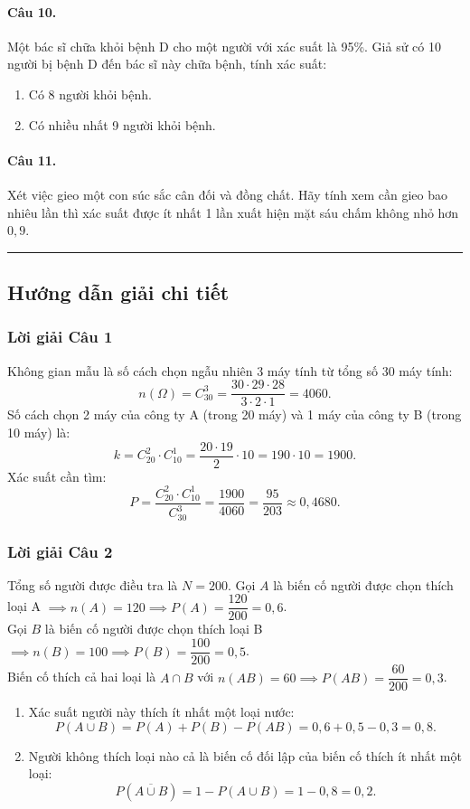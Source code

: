 \documentclass[12pt,a4paper]{article}
\theoremstyle{definition}
\begin{document}
\paragraph{Câu 10.} Một bác sĩ chữa khỏi bệnh D cho một người với xác suất là 95\%. Giả sử có 10 người bị bệnh D đến bác sĩ này chữa bệnh, tính xác suất:
\begin{enumerate}[label=\alph*)]
    \item Có 8 người khỏi bệnh.
    \item Có nhiều nhất 9 người khỏi bệnh.
\end{enumerate}

\paragraph{Câu 11.} Xét việc gieo một con súc sắc cân đối và đồng chất. Hãy tính xem cần gieo bao nhiêu lần thì xác suất được ít nhất 1 lần xuất hiện mặt sáu chấm không nhỏ hơn $0{,}9$.

\vspace{1em}
\hrule
\vspace{1.5em}

\subsection{Hướng dẫn giải chi tiết}

\subsubsection*{Lời giải Câu 1}
Không gian mẫu là số cách chọn ngẫu nhiên 3 máy tính từ tổng số 30 máy tính:
\[
n(\Omega) = C_{30}^3 = \frac{30 \cdot 29 \cdot 28}{3 \cdot 2 \cdot 1} = 4060.
\]
Số cách chọn 2 máy của công ty A (trong 20 máy) và 1 máy của công ty B (trong 10 máy) là:
\[
k = C_{20}^2 \cdot C_{10}^1 = \frac{20 \cdot 19}{2} \cdot 10 = 190 \cdot 10 = 1900.
\]
Xác suất cần tìm:
\[
P = \frac{C_{20}^2 \cdot C_{10}^1}{C_{30}^3} = \frac{1900}{4060} = \frac{95}{203} \approx 0{,}4680.
\]

\subsubsection*{Lời giải Câu 2}
Tổng số người được điều tra là $N = 200$.
Gọi $A$ là biến cố người được chọn thích loại A $\implies n(A) = 120 \implies P(A) = \dfrac{120}{200} = 0{,}6$.\\
Gọi $B$ là biến cố người được chọn thích loại B $\implies n(B) = 100 \implies P(B) = \dfrac{100}{200} = 0{,}5$.\\
Biến cố thích cả hai loại là $A \cap B$ với $n(AB) = 60 \implies P(AB) = \dfrac{60}{200} = 0{,}3$.
\begin{enumerate}[label=\arabic*.]
    \item Xác suất người này thích ít nhất một loại nước:
    \[
    P(A \cup B) = P(A) + P(B) - P(AB) = 0{,}6 + 0{,}5 - 0{,}3 = 0{,}8.
    \]
    \item Người không thích loại nào cả là biến cố đối lập của biến cố thích ít nhất một loại:
    \[
    P(\overline{A \cup B}) = 1 - P(A \cup B) = 1 - 0{,}8 = 0{,}2.
    \]
\end{enumerate}
\end{document}
